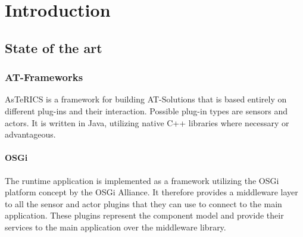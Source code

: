 \documentclass[BSA,Bachelor,english]{twbook}%
\begin{document}
{{{    \newcommand{\citefigm}[2]{(Source: taken with modification from \protect\cite{#1}, p. #2)}%
    \newcommand{\citep}{\citeasnoun}%
    \newcommand{\acessedthrough}{Available at:}%
    \newcommand{\acessedthroughp}{Available through:}%
    \newcommand{\acessedat}{Accessed}%
    \newcommand{\singlepage}{p.}%
    \newcommand{\multiplepages}{pp.}%
    \newcommand{\chapternr}{Ch.}%
    \renewcommand{\harvardand}{\&}%
    \newcommand{\abstractonly}{Abstract only}
    \newcommand{\edition}{~edition}%
}}}

\maketitle

%
%
\chapter{Introduction}



\section{State of the art}
\subsection{AT-Frameworks}
AsTeRICS is a framework for building AT-Solutions that is based entirely on different plug-ins and their interaction. Possible plug-in types are sensors and actors. It is written in Java, utilizing native C++ libraries where necessary or advantageous.

\subsubsection{OSGi}
The runtime application is implemented as a framework utilizing the OSGi platform concept by the OSGi Alliance. It therefore provides a middleware layer to all the sensor and actor plugins that they can use to connect to the main application. These plugins represent the component model and provide their services to the main application over the middleware library.
\end{document}
